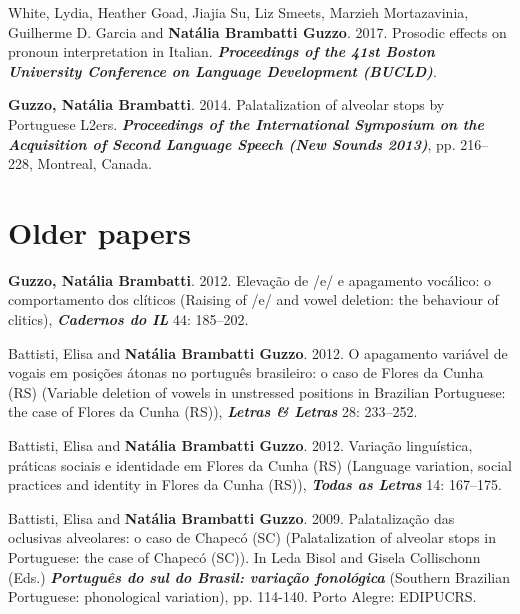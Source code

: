 \documentclass[letterpaper,10pt]{article}
\begin{document}
 White, Lydia, Heather Goad, Jiajia Su, Liz Smeets, Marzieh Mortazavinia, Guilherme D. Garcia and \textbf{Nat\'alia Brambatti Guzzo}. 2017. Prosodic effects on pronoun interpretation in Italian. \textbf{\textit{Proceedings of the 41st Boston University Conference on Language Development (BUCLD)}}.
 
 \textbf{Guzzo, Nat\'alia Brambatti}. 2014. Palatalization of alveolar stops by Portuguese L2ers. \textbf{\textit{Proceedings of the International Symposium on the Acquisition of Second Language Speech (New Sounds 2013)}}, pp. 216--228, Montreal, Canada. %


\vspace{0.3cm}

\section*{Older papers}

	
 \textbf{Guzzo, Nat\'alia Brambatti}. 2012. Eleva\c{c}\~ao de /e/ e apagamento voc\'alico: o comportamento dos cl\'i­ticos (Raising of /e/ and vowel deletion: the behaviour of clitics), \textbf{\emph{Cadernos do IL}} 44: 185--202.  
 
 Battisti, Elisa and \textbf{Nat\'alia Brambatti Guzzo}. 2012. O apagamento vari\'avel de vogais em posi\c{c}\~oes \'atonas no portugu\^es brasileiro: o caso de Flores da Cunha (RS) (Variable deletion of vowels in unstressed positions in Brazilian Portuguese: the case of Flores da Cunha (RS)), \textbf{\emph{Letras \& Letras}} 28: 233--252.  
 
 Battisti, Elisa and \textbf{Nat\'alia Brambatti Guzzo}. 2012. Varia\c{c}\~ao lingu\'istica, pr\'aticas sociais e identidade em Flores da Cunha (RS) (Language variation, social practices and identity in Flores da Cunha (RS)), \textbf{\emph{Todas as Letras}} 14: 167--175. 

 Battisti, Elisa and \textbf{Nat\'alia Brambatti Guzzo}. 2009. Palataliza\c{c}\~ao das oclusivas alveolares: o caso de Chapec\'o (SC) (Palatalization of alveolar stops in Portuguese: the case of Chapec\'o (SC)). In Leda Bisol and Gisela Collischonn (Eds.) \textbf{\textit{Portugu\^es do sul do Brasil: varia\c{c}\~ao fonol\'ogica}} (Southern Brazilian Portuguese: phonological variation), pp. 114-140. Porto Alegre: EDIPUCRS.
\end{document}
